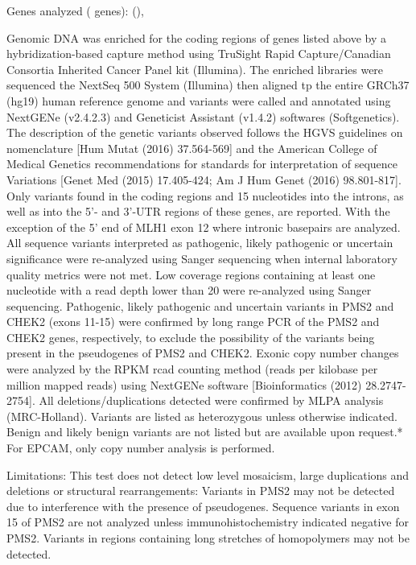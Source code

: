 \documentclass[10pt]{article}
\newcommand{\data}[1]{}
\newenvironment{dataiter}[1]{}{}
\begin{document}
{\small
Genes analyzed (\data{num_tested_genes} genes): \begin{dataiter}{tested_genes}\data{gene_symbol} (\data{refseq_mrna}), \end{dataiter}

Genomic DNA was enriched for the coding regions of genes listed above by a hybridization-based capture method using TruSight Rapid Capture/Canadian Consortia Inherited Cancer Panel kit (Illumina). The enriched libraries were sequenced the NextSeq 500 System (Illumina) then aligned tp the entire GRCh37 (hg19) human reference genome and variants were called and annotated using NextGENe (v2.4.2.3) and Geneticist Assistant (v1.4.2) softwares (Softgenetics). The description of the genetic variants observed follows the HGVS guidelines on nomenclature [Hum Mutat (2016) 37.564-569] and the American College of Medical Genetics recommendations for standards for interpretation of sequence Variations [Genet Med (2015) 17.405-424; Am J Hum Genet (2016) 98.801-817]. Only variants found in the coding regions and 15 nucleotides into the introns, as well as into the 5'- and 3'-UTR regions of these genes, are reported. With the exception of the 5' end of MLH1 exon 12 where intronic basepairs are analyzed. All sequence variants interpreted as pathogenic, likely pathogenic or uncertain significance were re-analyzed using Sanger sequencing when internal laboratory quality metrics were not met. Low coverage regions containing at least one nucleotide with a read depth lower than 20 were re-analyzed using Sanger sequencing. Pathogenic, likely pathogenic and uncertain variants in PMS2 and CHEK2 (exons 11-15) were confirmed by long range PCR of the PMS2 and CHEK2 genes, respectively, to exclude the possibility of the variants being present in the pseudogenes of PMS2 and CHEK2. Exonic copy number changes were analyzed by the RPKM rcad counting method (reads per kilobase per million mapped reads) using NextGENe software [Bioinformatics (2012) 28.2747-2754]. All deletions/duplications detected were confirmed by MLPA analysis (MRC-Holland). Variants are listed as heterozygous unless otherwise indicated.  Benign and likely benign variants are not listed but are available upon request.* For EPCAM, only copy number analysis is performed.

Limitations: This test does not detect low level mosaicism, large duplications and deletions or structural rearrangements: Variants in PMS2 may not be detected due to interference with the presence of pseudogenes. Sequence variants in exon 15 of PMS2 are not analyzed unless immunohistochemistry indicated negative for PMS2. Variants in regions containing long stretches of homopolymers may not be detected.

}
\end{document}
